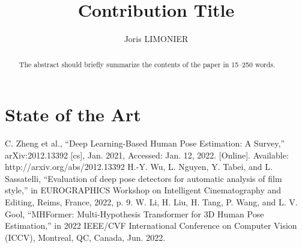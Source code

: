 \documentclass[runningheads]{llncs}
\begin{document}
\title{Contribution Title}

\author{Joris LIMONIER}
%
%
%
\maketitle              %
%
\begin{abstract}
The abstract should briefly summarize the contents of the paper in
15--250 words.

\end{abstract}
%
%
%
\section{State of the Art}






\begin{thebibliography}{8}
 C. Zheng et al., “Deep Learning-Based Human Pose Estimation: A Survey,” arXiv:2012.13392 [cs], Jan. 2021, Accessed: Jan. 12, 2022. [Online]. Available: http://arxiv.org/abs/2012.13392
 H.-Y. Wu, L. Nguyen, Y. Tabei, and L. Sassatelli, “Evaluation of deep pose detectors for automatic analysis of film style,” in EUROGRAPHICS Workshop on Intelligent Cinematography and Editing, Reims, France, 2022, p. 9.
 W. Li, H. Liu, H. Tang, P. Wang, and L. V. Gool, “MHFormer: Multi-Hypothesis Transformer for 3D Human Pose Estimation,” in 2022 IEEE/CVF International Conference on Computer Vision (ICCV), Montreal, QC, Canada, Jun. 2022.
\end{thebibliography}
\end{document}
